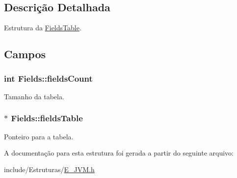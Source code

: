 \subsection{Descrição Detalhada}
Estrutura da \hyperlink{struct_fields_table}{Fields\+Table}. 

\subsection{Campos}
\hypertarget{struct_fields_a48a4d89fd6f0f586e7b34265f1bacc67}{}
\subsubsection[{fields\+Count}]{\setlength{\rightskip}{0pt plus 5cm}int Fields\+::fields\+Count}\label{struct_fields_a48a4d89fd6f0f586e7b34265f1bacc67}


Tamanho da tabela. 

\hypertarget{struct_fields_a6ec79b0bb356e60d228bce5980680779}{}
\subsubsection[{fields\+Table}]{$\ast$ Fields\+::fields\+Table}\label{struct_fields_a6ec79b0bb356e60d228bce5980680779}


Ponteiro para a tabela. 



A documentação para esta estrutura foi gerada a partir do seguinte arquivo\+:\begin{DoxyCompactItemize}
\item 
include/\+Estruturas/\hyperlink{_e___j_v_m_8h}{E\+\_\+\+J\+V\+M.\+h}\end{DoxyCompactItemize}
